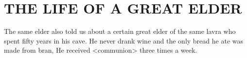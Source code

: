 \chapter{THE LIFE OF A GREAT ELDER}

The same elder also told us about a certain great elder of the same lavra who spent fifty years in his cave.
He never drank wine and the only bread he ate was made from bran, He received <communion> three times a week.
